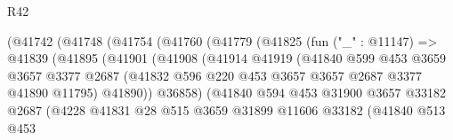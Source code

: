 \begin{lexlean}{R42}
\begin{coremodule}
                          (@41742
                            (@41748
                              (@41754
                                (@41760
                                  (@41779
                                    (@41825
                                      (fun ("_" : @11147) =>
                                      @41839
                                        (@41895
                                          (@41901
                                            (@41908
                                              (@41914
                                                @41919
                                                (@41840
                                                  @599
                                                  @453
                                                  @3659
                                                  @3657
                                                  @3377
                                                  @2687
                                                  (@41832
                                                    @596
                                                    @220
                                                    @453
                                                    @3657
                                                    @3657
                                                    @2687
                                                    @3377
                                                    @41890
                                                    @11795)
                                                  @41890))
                                              @36858)
                                            (@41840
                                              @594
                                              @453
                                              @31900
                                              @3657
                                              @33182
                                              @2687
                                              (@4228
                                                @41831
                                                @28
                                                @515
                                                @3659
                                                @31899
                                                @11606
                                                @33182
                                                (@41840
                                                  @513
                                                  @453

\end{coremodule}
\end{lexlean}
